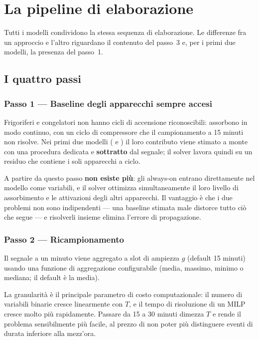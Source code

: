 \chapter{La pipeline di elaborazione}
\label{ch:pipeline}

Tutti i modelli condividono la stessa sequenza di elaborazione. Le differenze fra un approccio e
l'altro riguardano il contenuto del passo~3 e, per i primi due modelli, la presenza del passo~1.

\section{I quattro passi}

\subsection*{Passo 1 --- Baseline degli apparecchi sempre accesi}

Frigoriferi e congelatori non hanno cicli di accensione riconoscibili: assorbono in modo
continuo, con un ciclo di compressore che il campionamento a 15 minuti non risolve. Nei primi due
modelli ( e ) il loro contributo viene stimato a monte con una
procedura dedicata e \textbf{sottratto} dal segnale; il solver lavora quindi su un residuo che
contiene i soli apparecchi a ciclo.

A partire da  questo passo \textbf{non esiste più}: gli always-on entrano
direttamente nel modello come variabili, e il solver ottimizza simultaneamente il loro livello di
assorbimento e le attivazioni degli altri apparecchi. Il vantaggio è che i due problemi non sono
indipendenti --- una baseline stimata male distorce tutto ciò che segue --- e risolverli insieme
elimina l'errore di propagazione.

\subsection*{Passo 2 --- Ricampionamento}

Il segnale a un minuto viene aggregato a slot di ampiezza $g$ (default 15 minuti) usando una
funzione di aggregazione configurabile (media, massimo, minimo o mediana; il default è la media).

La granularità è il principale parametro di costo computazionale: il numero di variabili binarie
cresce linearmente con $T$, e il tempo di risoluzione di un MILP cresce molto più rapidamente.
Passare da 15 a 30 minuti dimezza $T$ e rende il problema sensibilmente più facile, al prezzo di
non poter più distinguere eventi di durata inferiore alla mezz'ora.

